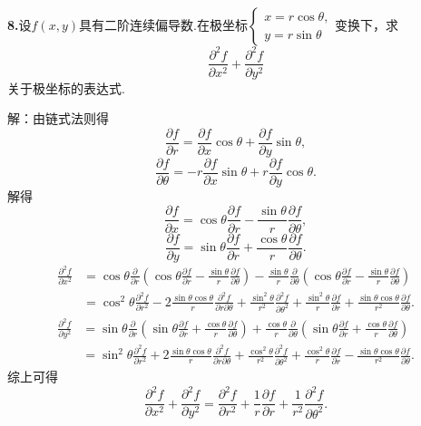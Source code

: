 \documentclass[12pt, a4paper]{article}
\begin{document}
\textbf{8.}设\(f(x, y)\)具有二阶连续偏导数.在极坐标\(\begin{cases}
x = r \cos\theta, \\
y = r \sin\theta
\end{cases}\)变换下，求
\[\frac{\partial^2 f}{\partial x^2} + \frac{\partial^2 f}{\partial y^2}\]
关于极坐标的表达式.

解：由链式法则得
\[\frac{\partial f}{\partial r} = \frac{\partial f}{\partial x} \cos\theta + \frac{\partial f}{\partial y} \sin\theta,\]
\[\frac{\partial f}{\partial \theta} = -r \frac{\partial f}{\partial x} \sin\theta + r \frac{\partial f}{\partial y} \cos\theta.\]
解得
\[\frac{\partial f}{\partial x} = \cos\theta \frac{\partial f}{\partial r} - \frac{\sin\theta}{r} \frac{\partial f}{\partial \theta},\]
\[\frac{\partial f}{\partial y} = \sin\theta \frac{\partial f}{\partial r} + \frac{\cos\theta}{r} \frac{\partial f}{\partial \theta}.\]
\begin{align*}
\frac{\partial^2 f}{\partial x^2} &= \cos\theta \frac{\partial}{\partial r} \left( \cos\theta \frac{\partial f}{\partial r} - \frac{\sin\theta}{r} \frac{\partial f}{\partial \theta} \right) - \frac{\sin\theta}{r} \frac{\partial}{\partial \theta} \left( \cos\theta \frac{\partial f}{\partial r} - \frac{\sin\theta}{r} \frac{\partial f}{\partial \theta} \right) \\
&= \cos^2\theta \frac{\partial^2 f}{\partial r^2} - 2 \frac{\sin\theta \cos\theta}{r} \frac{\partial^2 f}{\partial r \partial \theta} + \frac{\sin^2\theta}{r^2} \frac{\partial^2 f}{\partial \theta^2} + \frac{\sin^2\theta}{r} \frac{\partial f}{\partial r} + \frac{\sin\theta \cos\theta}{r^2} \frac{\partial f}{\partial \theta}.
\end{align*}
\begin{align*}
\frac{\partial^2 f}{\partial y^2} &= \sin\theta \frac{\partial}{\partial r} \left( \sin\theta \frac{\partial f}{\partial r} + \frac{\cos\theta}{r} \frac{\partial f}{\partial \theta} \right) + \frac{\cos\theta}{r} \frac{\partial}{\partial \theta} \left( \sin\theta \frac{\partial f}{\partial r} + \frac{\cos\theta}{r} \frac{\partial f}{\partial \theta} \right) \\
&= \sin^2\theta \frac{\partial^2 f}{\partial r^2} + 2 \frac{\sin\theta \cos\theta}{r} \frac{\partial^2 f}{\partial r \partial \theta} + \frac{\cos^2\theta}{r^2} \frac{\partial^2 f}{\partial \theta^2} + \frac{\cos^2\theta}{r} \frac{\partial f}{\partial r} - \frac{\sin\theta \cos\theta}{r^2} \frac{\partial f}{\partial \theta}.
\end{align*}
综上可得
\[\frac{\partial^2 f}{\partial x^2} + \frac{\partial^2 f}{\partial y^2} = \frac{\partial^2 f}{\partial r^2} + \frac{1}{r} \frac{\partial f}{\partial r} + \frac{1}{r^2} \frac{\partial^2 f}{\partial \theta^2}.\]
\end{document}
